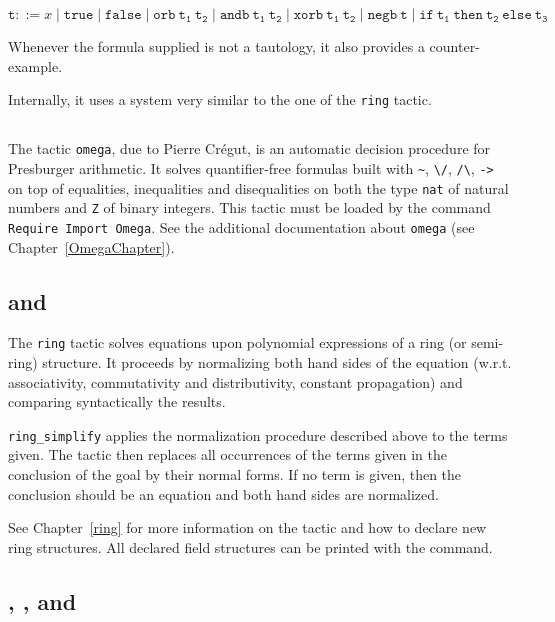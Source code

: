 $$\mathtt{t} ::= x \mid \mathtt{true} \mid \mathtt{false}\mid \mathtt{orb\ t_1\ t_2}
\mid \mathtt{andb\ t_1\ t_2} \mid\mathtt{xorb\ t_1\ t_2} \mid\mathtt{negb\ t}
\mid\mathtt{if\ t_1\ then\ t_2\ else\ t_3}
$$

Whenever the formula supplied is not a tautology, it also provides a counter-example.

Internally, it uses a system very similar to the one of the {\tt ring} tactic.

\subsection{}
\label{omega}

The tactic \texttt{omega}, due to Pierre Cr{\'e}gut,
is an automatic decision procedure for Presburger
arithmetic. It solves quantifier-free
formulas built with \verb|~|, \verb|\/|, \verb|/\|,
\verb|->| on top of equalities, inequalities and disequalities on
both the type \texttt{nat} of natural numbers and \texttt{Z} of binary
integers. This tactic must be loaded by the command \texttt{Require Import
  Omega}. See the additional documentation about \texttt{omega}
(see Chapter~\ref{OmegaChapter}).

\subsection{{} and {}}

The {\tt ring} tactic solves equations upon polynomial expressions of
a ring (or semi-ring) structure. It proceeds by normalizing both hand
sides of the equation (w.r.t. associativity, commutativity and
distributivity, constant propagation) and comparing syntactically the
results.

{\tt ring\_simplify} applies the normalization procedure described
above to the terms given. The tactic then replaces all occurrences of
the terms given in the conclusion of the goal by their normal
forms. If no term is given, then the conclusion should be an equation
and both hand sides are normalized.

See Chapter~\ref{ring} for more information on the tactic and how to
declare new ring structures.  All declared field structures can be
printed with the {} command.

\subsection{{}, {}, and {}}


